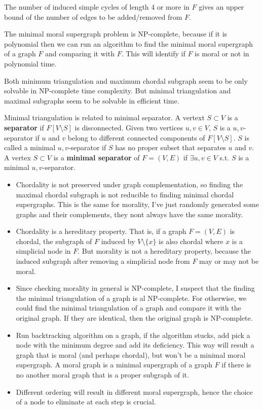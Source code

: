 \begin{remark}
The number of induced simple cycles of length 4 or more in $F$ gives an upper bound of the number of edges to be added/removed from $F$.
\end{remark}

\begin{remark}
The minimal moral supergraph problem is NP-complete, because if it is polynomial then we can run an algorithm to find the minimal moral supergraph of a graph $F$ and comparing it with $F$. This will identify if $F$ is moral or not in polynomial time. 
\end{remark}

Both minimum triangulation and maximum chordal subgraph seem to be only solvable in NP-complete time complexity. But minimal triangulation and maximal subgraphs seem to be solvable in efficient time. 

Minimal triangulation is related to minimal separator. A vertext $S\subset V$ is a \textbf{separator} if $F[V\setminus S]$ is disconnected. Given two vertices $u,v\in V$, $S$ is a $u,v$-separator if $u$ and $v$ belong to different connected components of $F[V\setminus S]$. $S$ is called a minimal $u,v$-separator if $S$ has no proper subset that separates $u$ and $v$. A vertex $S\subset V$ is a \textbf{minimal separator} of $F=(V,E)$ if $\exists u, v \in V$ s.t. $S$ is a minimal $u,v$-separator. 
 

\begin{itemize}
\item Chordality is not preserved under graph complementation, so finding the maximal chordal subgraph is not reducible to finding minimal chordal supergraphs. This is the same for morality, I've just randomly generated some graphs and their complements, they nont always have the same morality. 
\item Chordality is a hereditary property. That is, if a graph $F=(V,E)$ is chordal, the subgraph of $F$ induced by $V\setminus \{x\}$ is also chordal where $x$ is a simplicial node in $F$. But morality is not a hereditary property, because the induced subgraph after removing a simplicial node from $F$ may or may not be moral. 
\item Since checking morality in general is NP-complete, I suspect that the finding the minimal triangulation of a graph is al NP-complete. For otherwise, we could find the minimal triangulation of a graph and compare it with the original graph. If they are identical, then the original graph is NP-complete. 
\item Run backtracking algorithm on a graph, if the algorithm stucks, add pick a node with the minimum degree and add its deficiency. This way will result a graph that is moral (and perhaps chordal), but won't be a minimal moral supergraph. A moral graph is a minimal supergraph of a graph $F$ if there is no another moral graph that is a proper subgraph of it. 
\item Different ordering will result in different moral supergraph, hence the choice of a node to eliminate at each step is crucial. 
\end{itemize}


